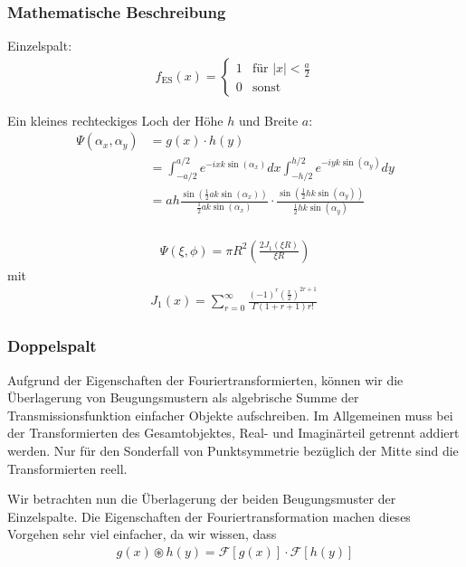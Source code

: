 \documentclass{beamer}
\begin{document}
\begin{frame}
  \frametitle{Mathematische Beschreibung}

Einzelspalt:
\begin{align*}
f_\text{ES}(x) = \begin{cases} 
1  &\text{für } |x| <  \frac{a}{2} \\
0 & \text{sonst}\end{cases}
\label{eq:einzelspalt}
\end{align*}

Ein kleines rechteckiges Loch der Höhe $h$ und Breite $a$:
\begin{align*}
\Psi(\alpha_x,\alpha_y) &= g(x) \cdot h(y) \\
&= \int_{-a/2}^{a/2} e^{-ixk\sin(\alpha_x)} dx \int_{-h/2}^{h/2} e^{-iyk\sin(\alpha_y)}dy\\
&= ah \frac{\sin(\frac{1}{2} ak\sin(\alpha_x))}{\frac{1}{2} ak\sin(\alpha_x)} \cdot \frac{\sin(\frac{1}{2} hk\sin(\alpha_y))}{\frac{1}{2} hk\sin(\alpha_y)}\\
\end{align*}

\begin{align*}
\Psi (\xi,\phi ) = \pi R^2 \left( \frac{2J_1(\xi R)}{\xi R} \right)
\end{align*}
mit 
\begin{align*}
J_{1}(x)=\sum _{{r=0}}^{\infty }{\frac  {(-1)^{r}({\frac  {x}{2}})^{{2r+1 }}}{\Gamma (1 +r+1)r!}}\, 
\end{align*}



\end{frame}




\begin{frame}
  \frametitle{Doppelspalt}

\begin{block}
Aufgrund der Eigenschaften der Fouriertransformierten, können wir die Überlagerung von Beugungsmustern als algebrische Summe der Transmissionsfunktion einfacher Objekte aufschreiben. Im Allgemeinen muss bei der Transformierten des Gesamtobjektes, Real- und Imaginärteil getrennt addiert werden. Nur für den Sonderfall von Punktsymmetrie bezüglich der Mitte sind die Transformierten reell. 
\end{block}

\begin{block}
Wir betrachten nun die Überlagerung der beiden Beugungsmuster der Einzelspalte. Die Eigenschaften der Fouriertransformation machen dieses Vorgehen sehr viel einfacher, da wir wissen, dass
\begin{align*}
g(x) \circledast h(y) = \mathscr{F}[g(x)] \cdot \mathscr{F}[h(y)] \\
\end{align*}
\end{block}

\end{frame}
\end{document}

